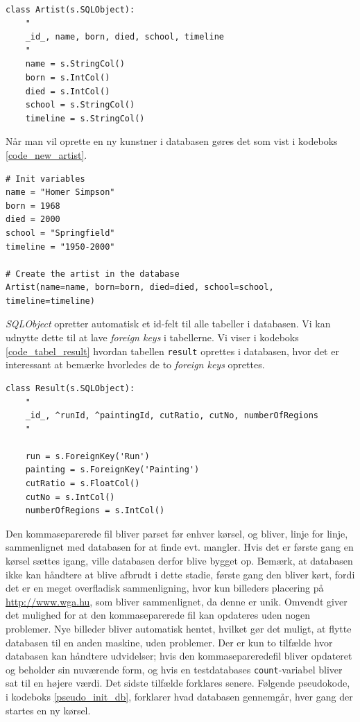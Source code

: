 {\begin{lstlisting}[caption={Pythonkode for oprettelse af tabeller i
    databasen.}, captionpos=b, label={code_tabel_artist}, frame=tb,
    breaklines=false, float=hb]
class Artist(s.SQLObject):
    "
    _id_, name, born, died, school, timeline
    "
    name = s.StringCol()
    born = s.IntCol()
    died = s.IntCol()
    school = s.StringCol()
    timeline = s.StringCol()
\end{lstlisting}

Når man vil oprette en ny kunstner i databasen gøres det som vist
i kodeboks \ref{code_new_artist}.

\begin{lstlisting}[caption={Oprettelse af en kunstner i databasen.},
    captionpos=b, label={code_new_artist}, frame=tb, breaklines=false,
    float=h]
# Init variables
name = "Homer Simpson"
born = 1968
died = 2000
school = "Springfield"
timeline = "1950-2000"

# Create the artist in the database
Artist(name=name, born=born, died=died, school=school, timeline=timeline)
\end{lstlisting}

\emph{SQLObject} opretter automatisk et id-felt til alle tabeller i
databasen. Vi kan udnytte dette til at lave \emph{foreign keys} i
tabellerne. Vi viser i kodeboks \ref{code_tabel_result} hvordan tabellen
\texttt{result} oprettes i databasen, hvor det er interessant at bemærke
hvorledes de to \emph{foreign keys} oprettes.

\begin{lstlisting}[caption={Pythonkode for oprettelse af \emph{foreign
    keys} i databasen.}, captionpos=b, label={code_tabel_result}, frame=tb,
    breaklines=false, float=h]
class Result(s.SQLObject):
    "
    _id_, ^runId, ^paintingId, cutRatio, cutNo, numberOfRegions
    "

    run = s.ForeignKey('Run')
    painting = s.ForeignKey('Painting')
    cutRatio = s.FloatCol()
    cutNo = s.IntCol()
    numberOfRegions = s.IntCol()
\end{lstlisting}

Den kommaseparerede fil bliver parset før enhver kørsel, og bliver, linje for linje, sammenlignet med
databasen for at finde evt. mangler. Hvis det er første gang en kørsel
sættes igang, ville databasen derfor blive bygget op.  Bemærk, at databasen ikke kan
håndtere at blive afbrudt i dette stadie, første gang den bliver kørt,
fordi det er en meget overfladisk sammenligning, hvor kun billeders
placering på \url{http://www.wga.hu}, som bliver sammenlignet, da denne
er unik.  Omvendt giver det mulighed for at den kommaseparerede fil kan
opdateres uden nogen problemer. Nye billeder bliver automatisk hentet,
hvilket gør det muligt, at flytte databasen til en anden maskine, uden
problemer. Der er kun to tilfælde hvor databasen kan håndtere
udvidelser; hvis den kommasepareredefil bliver opdateret og beholder sin
nuværende form, og hvis en testdatabases \texttt{count}-variabel bliver
sat til en højere værdi. Det sidste tilfælde forklares senere.  Følgende
pseudokode, i kodeboks \ref{pseudo_init_db}, forklarer hvad databasen
gennemgår, hver gang der startes en ny kørsel.

}
